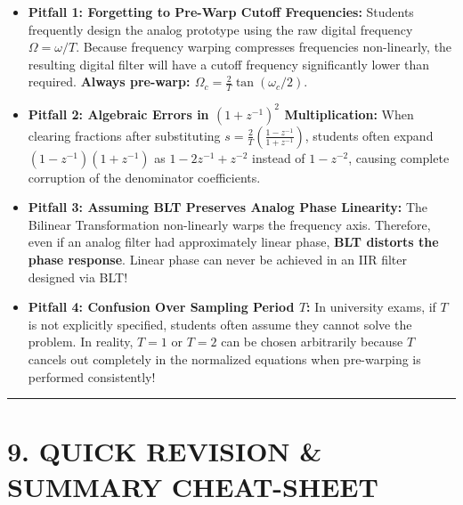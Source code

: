 \documentclass[11pt,a4paper]{article}
\begin{document}
\begin{itemize}
    \item \textbf{Pitfall 1: Forgetting to Pre-Warp Cutoff Frequencies:}
    Students frequently design the analog prototype using the raw digital frequency $\Omega = \omega / T$. Because frequency warping compresses frequencies non-linearly, the resulting digital filter will have a cutoff frequency significantly lower than required. \textbf{Always pre-warp: $\Omega_c = \frac{2}{T}\tan(\omega_c/2)$}.
    
    \item \textbf{Pitfall 2: Algebraic Errors in $(1 + z^{-1})^2$ Multiplication:}
    When clearing fractions after substituting $s = \frac{2}{T}\left(\frac{1 - z^{-1}}{1 + z^{-1}}\right)$, students often expand $(1 - z^{-1})(1 + z^{-1})$ as $1 - 2z^{-1} + z^{-2}$ instead of $1 - z^{-2}$, causing complete corruption of the denominator coefficients.
    
    \item \textbf{Pitfall 3: Assuming BLT Preserves Analog Phase Linearity:}
    The Bilinear Transformation non-linearly warps the frequency axis. Therefore, even if an analog filter had approximately linear phase, \textbf{BLT distorts the phase response}. Linear phase can never be achieved in an IIR filter designed via BLT!
    
    \item \textbf{Pitfall 4: Confusion Over Sampling Period $T$:}
    In university exams, if $T$ is not explicitly specified, students often assume they cannot solve the problem. In reality, $T = 1$ or $T = 2$ can be chosen arbitrarily because $T$ cancels out completely in the normalized equations when pre-warping is performed consistently!
\end{itemize}

\noindent\rule{\textwidth}{0.5pt}

\section{9. QUICK REVISION \& SUMMARY CHEAT-SHEET}
\end{document}
